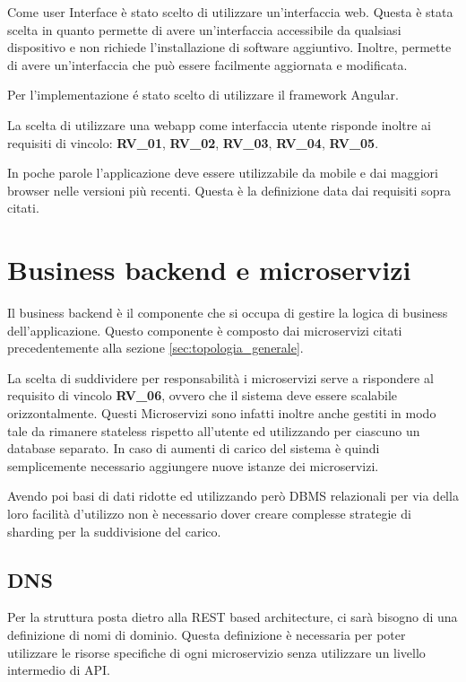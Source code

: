 Come user Interface è stato scelto di utilizzare un'interfaccia web. Questa è stata scelta in quanto permette di avere un'interfaccia accessibile da qualsiasi dispositivo e non richiede l'installazione di software aggiuntivo. Inoltre, permette di avere un'interfaccia che può essere facilmente aggiornata e modificata.

Per l'implementazione é stato scelto di utilizzare il framework Angular.

La scelta di utilizzare una webapp come interfaccia utente risponde inoltre ai requisiti di vincolo: \textbf{RV\_01}, \textbf{RV\_02}, \textbf{RV\_03}, \textbf{RV\_04}, \textbf{RV\_05}.

In poche parole l'applicazione deve essere utilizzabile da mobile e dai maggiori browser nelle versioni più recenti. Questa è la definizione data dai requisiti sopra citati.

\section{Business backend e microservizi}

Il business backend è il componente che si occupa di gestire la logica di business dell'applicazione. Questo componente è composto dai microservizi citati precedentemente alla sezione \ref{sec:topologia_generale}.

La scelta di suddividere per responsabilità i microservizi serve a rispondere al requisito di vincolo \textbf{RV\_06}, ovvero che il sistema deve essere scalabile orizzontalmente. Questi Microservizi sono infatti inoltre anche gestiti in modo tale da rimanere stateless rispetto all'utente ed utilizzando per ciascuno un database separato. In caso di aumenti di carico del sistema è quindi semplicemente necessario aggiungere nuove istanze dei microservizi.

Avendo poi basi di dati ridotte ed utilizzando però DBMS relazionali per via della loro facilità d'utilizzo non è necessario dover creare complesse strategie di sharding per la suddivisione del carico.

\subsection{DNS}

Per la struttura posta dietro alla REST based architecture, ci sarà bisogno di una definizione di nomi di dominio. Questa definizione è necessaria per poter utilizzare le risorse specifiche di ogni microservizio senza utilizzare un livello intermedio di API.

